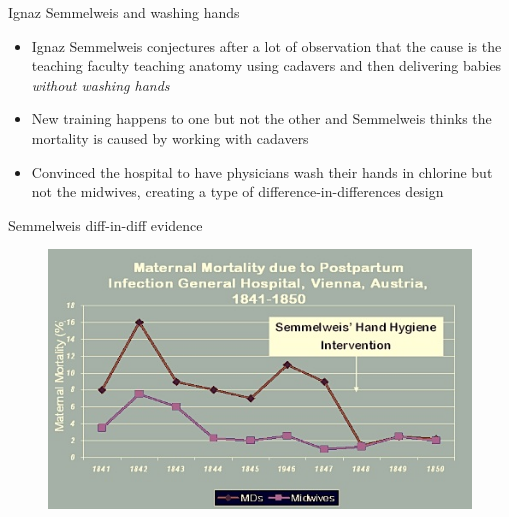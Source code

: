 \documentclass{beamer}
\begin{document}
\begin{frame}{Ignaz Semmelweis and washing hands}

\begin{itemize}
\item Ignaz Semmelweis conjectures after a lot of observation that the cause is the teaching faculty teaching anatomy using cadavers and then delivering babies \emph{without washing hands}
\item New training happens to one but not the other and Semmelweis thinks the mortality is caused by working with cadavers
\item Convinced the hospital to have physicians wash their hands in chlorine but not the midwives, creating a type of difference-in-differences design 
\end{itemize}

\end{frame}

\begin{frame}{Semmelweis diff-in-diff evidence}

	\begin{figure}
	\includegraphics[scale=0.5]{./lecture_includes/semmelweis_graph.jpg}
	\end{figure}


\end{frame}
\end{document}
